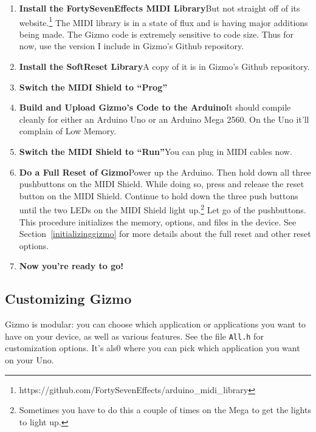 \documentclass{article}
\begin{document}
\begin{enumerate}
\item {\bf Install the FortySevenEffects MIDI Library}\quad But not straight off of its website.\footnote{https:/\!/github.com/FortySevenEffects/arduino\_midi\_library}  The MIDI library is in a state of flux and is having major additions being made.  The Gizmo code is extremely sensitive to code size.  Thus for now, use the version I include in Gizmo's Github repository.

\item {\bf Install the SoftReset Library}\quad A copy of it is in Gizmo's Github repository.

\item {\bf Switch the MIDI Shield to ``Prog''}

\item {\bf Build and Upload Gizmo's Code to the Arduino}\quad  It should compile cleanly for either an Arduino Uno or an Arduino Mega 2560.  On the Uno it'll complain of Low Memory.

\item {\bf Switch the MIDI Shield to ``Run''}\quad  You can plug in MIDI cables now.

\item {\bf Do a Full Reset of Gizmo}\quad Power up the Arduino.  Then hold down all three pushbuttons on the MIDI Shield.  While doing so, press and release the reset button on the MIDI Shield.  Continue to hold down the three push buttons until the two LEDs on the MIDI Shield light up.\footnote{Sometimes you have to do this a couple of times on the Mega to get the lights to light up.}  Let go of the pushbuttons.  This procedure initializes the memory, options, and files in the device.  See Section~\ref{initializinggizmo} for more details about the full reset and other reset options.  

\item {\bf Now you're ready to go!}

\end{enumerate}

\subsection{Customizing Gizmo}

Gizmo is modular: you can choose which application or applications you want to have on your device, as well as various features.  See the file \texttt{All.h} for customization options.  It's als0 where you can pick which application you want on your Uno.
\end{document}
